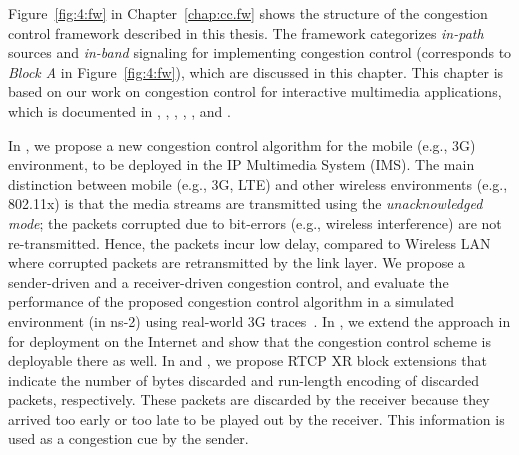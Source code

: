 Figure~\ref{fig:4:fw} in Chapter~\ref{chap:cc.fw} shows the structure of the
congestion control framework described in this thesis. The framework
categorizes \emph{in-path} sources and \emph{in-band} signaling for
implementing congestion control (corresponds to \emph{Block A} in
Figure~\ref{fig:4:fw}), which are discussed in this chapter. This chapter is
based on our work on congestion control for interactive multimedia
applications, which is documented in , ,
, \cite{rfc7097},
\cite{draft.xr.bytes.discarded}, \cite{singh:2010.thesis} and
\cite{Singh:control.loops.api}.

In , we propose a new congestion control algorithm for the
mobile (e.g., 3G) environment, to be deployed in the IP Multimedia System
(IMS). The main distinction between mobile (e.g., 3G, LTE) and other wireless
environments (e.g., 802.11x) is that the media streams are transmitted using
the \emph{unacknowledged mode}; the packets corrupted due to bit-errors (e.g.,
wireless interference) are not re-transmitted. Hence, the packets incur low
delay, compared to Wireless LAN where corrupted packets are retransmitted by
the link layer. We propose a sender-driven and a receiver-driven congestion
control, and evaluate the performance of the proposed congestion control
algorithm in a simulated environment (in ns-2) using real-world 3G
traces~\cite{s4.eval.bitrate, 3gppSim}. In , we extend the
approach in  for deployment on the Internet and show that the
congestion control scheme is deployable there as well. In \cite{rfc7097} and
\cite{draft.xr.bytes.discarded}, we propose RTCP XR block extensions that
indicate the number of bytes discarded and run-length encoding of discarded
packets, respectively. These packets are discarded by the receiver because
they arrived too early or too late to be played out by the receiver. This
information is used as a congestion cue by the sender.


